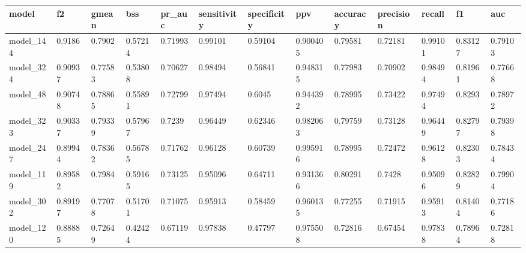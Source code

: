 \begin{tabular}{|l|l|l|l|l|l|l|l|l|l|l|l|l|}
\hline
\textbf{model} & \textbf{f2} & \textbf{gmean} & \textbf{bss} & \textbf{pr\_auc} & \textbf{sensitivity} & \textbf{specificity} & \textbf{ppv} & \textbf{accuracy} & \textbf{precision} & \textbf{recall} & \textbf{f1} & \textbf{auc} \\ \hline
model\_144     & 0.9186      & 0.7902         & 0.57214      & 0.71993          & 0.99101              & 0.59104              & 0.900405     & 0.79581           & 0.72181            & 0.99101         & 0.83127     & 0.79103      \\ \hline
model\_324     & 0.90937     & 0.77583        & 0.53808      & 0.70627          & 0.98494              & 0.56841              & 0.948315     & 0.77983           & 0.70902            & 0.98494         & 0.81961     & 0.77668      \\ \hline
model\_48      & 0.90748     & 0.78865        & 0.55891      & 0.72799          & 0.97494              & 0.6045               & 0.944392     & 0.78995           & 0.73422            & 0.97494         & 0.8293      & 0.78972      \\ \hline
model\_323     & 0.90337     & 0.79339        & 0.57967      & 0.7239           & 0.96449              & 0.62346              & 0.982063     & 0.79759           & 0.73128            & 0.96449         & 0.82797     & 0.79398      \\ \hline
model\_247     & 0.89944     & 0.78362        & 0.56785      & 0.71762          & 0.96128              & 0.60739              & 0.995916     & 0.78995           & 0.72472            & 0.96128         & 0.82303     & 0.78434      \\ \hline
model\_119     & 0.89582     & 0.7984         & 0.59165      & 0.73125          & 0.95096              & 0.64711              & 0.931366     & 0.80291           & 0.7428             & 0.95096         & 0.82829     & 0.79904      \\ \hline
model\_302     & 0.89197     & 0.77078        & 0.51701      & 0.71075          & 0.95913              & 0.58459              & 0.960135     & 0.77255           & 0.71915            & 0.95913         & 0.81404     & 0.77186      \\ \hline
model\_120     & 0.88885     & 0.72649        & 0.42424      & 0.67119          & 0.97838              & 0.47797              & 0.975508     & 0.72816           & 0.67454            & 0.97838         & 0.78964     & 0.72818      \\ \hline

\end{tabular}

